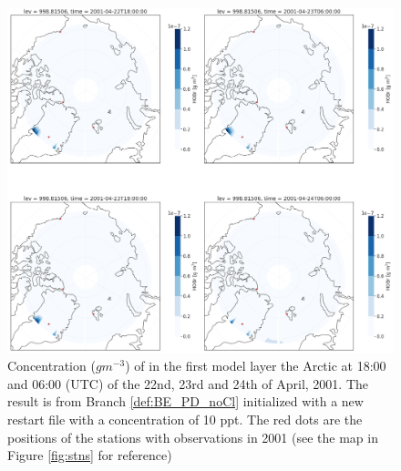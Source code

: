 \begin{figure}[h]
    \centering
    \includegraphics[width=\linewidth]{Chapter6_Results/images/polarHOBr_step4.png}
    \caption{Concentration ($g m^{-3}$) of  in the first model layer the Arctic at 18:00 and 06:00 (UTC) of the  22nd, 23rd and 24th of April, 2001. The result is from Branch \ref{def:BE_PD_noCl} initialized with a new restart file with a  concentration of 10 ppt. The red dots are the positions of the stations with observations in 2001 (see the map in Figure \ref{fig:stns} for reference)}
    \label{fig:polarHOBr_step4}
\end{figure}